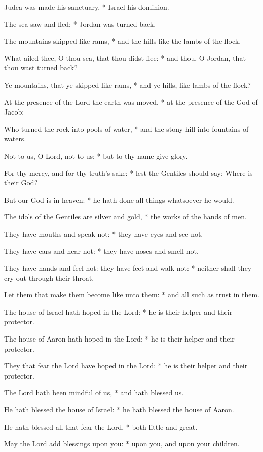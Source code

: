 ﻿\item Judea was made his sanctuary, * Israel his dominion.
\item The sea saw and fled: * Jordan was turned back.
\item The mountains skipped like rams, * and the hills like the lambs of the flock.
\item What ailed thee, O thou sea, that thou didst flee: * and thou, O Jordan, that thou wast turned back?
\item Ye mountains, that ye skipped like rams, * and ye hills, like lambs of the flock?
\item At the presence of the Lord the earth was moved, * at the presence of the God of Jacob:
\item Who turned the rock into pools of water, * and the stony hill into fountains of waters.
\item Not to us, O Lord, not to us; * but to thy name give glory.
\item For thy mercy, and for thy truth’s sake: * lest the Gentiles should say: Where is their God?
\item But our God is in heaven: * he hath done all things whatsoever he would.
\item The idols of the Gentiles are silver and gold, * the works of the hands of men.
\item They have mouths and speak not: * they have eyes and see not.
\item They have ears and hear not: * they have noses and smell not.
\item They have hands and feel not: they have feet and walk not: * neither shall they cry out through their throat.
\item Let them that make them become like unto them: * and all such as trust in them.
\item The house of Israel hath hoped in the Lord: * he is their helper and their protector.
\item The house of Aaron hath hoped in the Lord: * he is their helper and their protector.
\item They that fear the Lord have hoped in the Lord: * he is their helper and their protector.
\item The Lord hath been mindful of us, * and hath blessed us.
\item He hath blessed the house of Israel: * he hath blessed the house of Aaron.
\item He hath blessed all that fear the Lord, * both little and great.
\item May the Lord add blessings upon you: * upon you, and upon your children.
